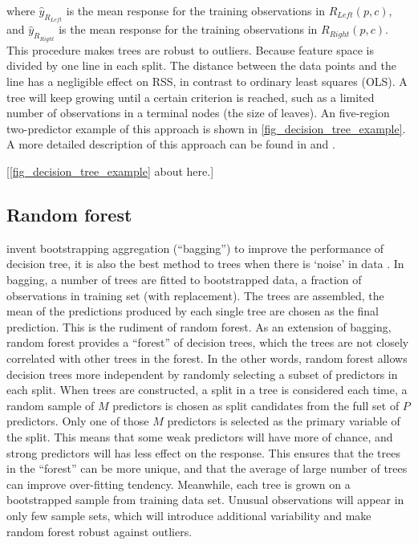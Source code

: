 \documentclass[12pt,a4paper]{article}
\begin{document}
where $\hat{y}_{R_{Left}}$ is the mean response for the training observations in $R_{Left}(p,c)$, and $\hat{y}_{R_{Right}}$ is the mean response for the training observations in $R_{Right}(p,c)$. This procedure makes trees are robust to outliers. Because feature space is divided by one line in each split. The distance between the data points and the line has a negligible effect on RSS, in contrast to ordinary least squares (OLS). A tree will keep growing until a certain criterion is reached, such as a limited number of observations in a terminal nodes (the size of leaves). An five-region two-predictor example of this approach is shown in \autoref{fig_decision_tree_example}. A more detailed description of this approach can be found in \citet{Breiman1984} and \citet{Hastie2009}.

%
\begin{center}
[\autoref{fig_decision_tree_example} about here.]
\end{center}
%

\subsection*{Random forest}

\citet{Breiman1996} invent bootstrapping aggregation (``bagging'') to improve the performance of decision tree, it is also the best method to trees when there is `noise' in data \citep{Dietterich2000}. In bagging, a number of trees are fitted to bootstrapped data, a fraction of observations in training set (with replacement). The trees are assembled, the mean of the predictions produced by each single tree are chosen as the final prediction. This is the rudiment of random forest. As an extension of bagging, random forest \citep{Breiman2001} provides a ``forest'' of decision trees, which the trees are not closely correlated with other trees in the forest. In the other words, random forest allows decision trees more independent by randomly selecting a subset of predictors in each split. When trees are constructed, a split in a tree is considered each time, a random sample of $M$ predictors is chosen as split candidates from the full set of $P$ predictors. Only one of those $M$ predictors is selected as the primary variable of the split. This means that some weak predictors will have more of chance, and strong predictors will has less effect on the response. This ensures that the trees in the ``forest'' can be more unique, and that the average of large number of trees can improve over-fitting tendency. Meanwhile, each tree is grown on a bootstrapped sample from training data set. Unusual observations will appear in only few sample sets, which will introduce additional variability and make random forest robust against outliers.
\end{document}
